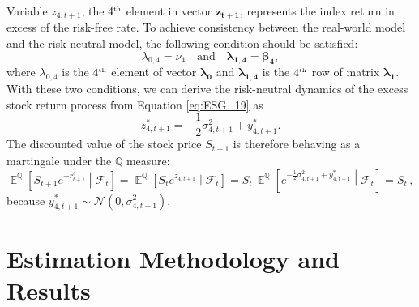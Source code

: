 \documentclass{sfuthesis}
\DeclareMathOperator{\E}{\mathbb{E}}
\numberwithin{equation}{chapter}
\begin{document}
	
		\justify
		Variable $z_{4, t+1}$, the $4^{\text{\tiny{th}}}$ element in vector $\boldsymbol{z_{t+1}}$, represents the index return in excess of the risk-free rate. To achieve consistency between the real-world model and the risk-neutral model, the following condition should be satisfied:
		\begin{equation}
		\label{eq:ESG_22}
		\lambda_{0,4} = \nu_{4} \quad \text{and} \quad \boldsymbol{\lambda_{1,4} = \beta_{4}},
		\end{equation}
		where $\lambda_{0,4}$ is the $4^\text{\tiny{th}}$ element of vector $\boldsymbol{\lambda_0}$ and $\boldsymbol{\lambda_{1,4}}$ is the $4^\text{\tiny{th}}$ row of matrix $\boldsymbol{\lambda_1}$. With these two conditions, we can derive the risk-neutral dynamics of the excess stock return process from Equation \eqref{eq:ESG_19} as
		\begin{equation}
		\label{eq:ESG_23}
		z_{4,t+1}^* = -\frac{1}{2}\sigma_{4,t+1}^2 + y_{4,t+1}^*.
		\end{equation}
		The discounted value of the stock price $S_{t+1}$ is therefore behaving as a martingale under the $\mathbb{Q}$ measure:
		\begin{equation}
		\label{eq:ESG_24}
		\E^\mathbb{Q}\left[S_{t+1}e^{-r_{t+1}^s}\middle|\mathcal{F}_{t}\right] = \E^\mathbb{Q}\left[S_{t}e^{z_{4,t+1}}\middle|\mathcal{F}_{t}\right] = S_{t}\,\E^\mathbb{Q}\left[e^{-\frac{1}{2}\sigma_{4,t+1}^2+y_{4,t+1}^{*}}\middle|\mathcal{F}_{t}\right] = S_{t}\,,
		\end{equation}
		because $y_{4,t+1}^* \sim \mathcal{N}(0,\sigma_{4,t+1}^2)$. 
	
	
	\chapter{Estimation Methodology and Results} 
	\label{Estimation Methodology and Results}
\end{document}
